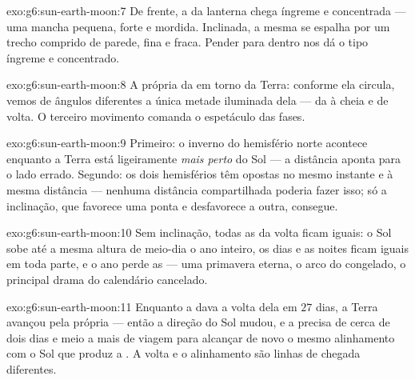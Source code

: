 \begin{solution}{exo:g6:sun-earth-moon:7}
De frente, a  da lanterna chega íngreme e concentrada --- uma
mancha pequena, forte e mordida. Inclinada, a mesma  se espalha
por um trecho comprido de parede, fina e fraca. Pender para dentro
nos dá o tipo íngreme e concentrado.
\end{solution}

\begin{solution}{exo:g6:sun-earth-moon:8}
A própria  da  em torno da Terra: conforme ela circula,
vemos de ângulos diferentes a única metade iluminada dela --- da  à cheia e de volta. O terceiro movimento comanda o
espetáculo das fases.
\end{solution}

\begin{solution}{exo:g6:sun-earth-moon:9}
Primeiro: o inverno do hemisfério norte acontece enquanto a Terra
está ligeiramente \emph{mais perto} do Sol --- a distância aponta
para o lado errado. Segundo: os dois hemisférios têm  opostas
no mesmo instante e à mesma distância --- nenhuma distância
compartilhada poderia fazer isso; só a inclinação, que favorece uma
ponta e desfavorece a outra, consegue.
\end{solution}

\begin{solution}{exo:g6:sun-earth-moon:10}
Sem inclinação, todas as  da volta ficam iguais: o Sol sobe
até a mesma altura de meio-dia o ano inteiro, os dias e as noites
ficam iguais em toda parte, e o ano perde as  --- uma
primavera eterna, o arco do  congelado, o principal
drama do calendário cancelado.
\end{solution}

\begin{solution}{exo:g6:sun-earth-moon:11}
Enquanto a  dava a volta dela em $27$ dias, a Terra avançou pela
própria  --- então a direção do Sol mudou, e a  precisa de
cerca de dois dias e meio a mais de viagem para alcançar de novo o
mesmo alinhamento com o Sol que produz a . A volta e o
alinhamento são linhas de chegada diferentes.
\end{solution}


